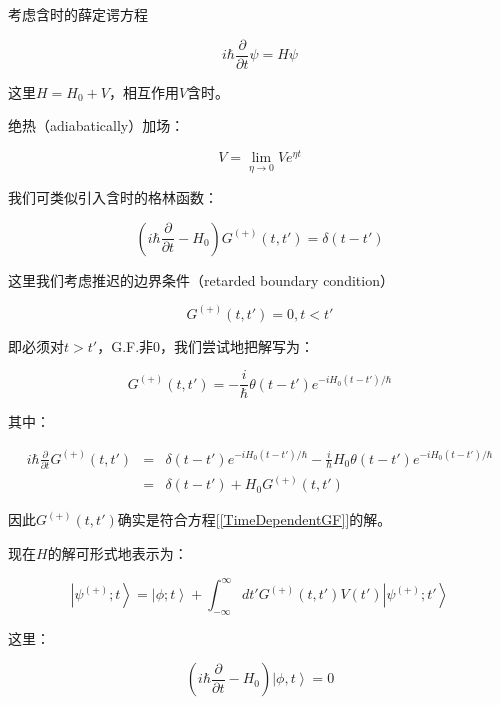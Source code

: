 考虑含时的薛定谔方程

\begin{equation}
i \hbar \frac{\partial }{\partial t} \psi = H \psi
\end{equation}

这里$H = H_0 + V$，相互作用$V$含时。

绝热（adiabatically）加场：

\begin{equation}
V = \lim\limits_{\eta \to 0} V e^{\eta t}
\end{equation}

我们可类似引入含时的格林函数：

\begin{equation}
\left( i \hbar \frac{\partial }{\partial t} - H_0 \right) G^{(+)} (t,t') = \delta(t - t')
\label{TimeDependentGF}
\end{equation}

这里我们考虑推迟的边界条件（retarded boundary condition）

\begin{equation}
G^{(+)} (t , t') = 0 , t<t'
\end{equation}

即必须对$t > t'$，G.F.非0，我们尝试地把解写为：

\begin{equation}
G^{(+)} (t, t') = - \frac{i }{\hbar } \theta(t-t') e^{- i H_0 (t - t') / \hbar}
\end{equation}

其中：

\begin{eqnarray*}
i \hbar \frac{\partial }{\partial t} G^{(+)} (t, t') & = & \delta(t - t')e^{- i H_0 (t - t') / \hbar} - \frac{i }{\hbar} H_0 \theta(t-t')e^{- i H_0 (t - t') / \hbar}  \\
{} & = & \delta(t - t') + H_0 G^{(+)}(t,t') 
\end{eqnarray*}

因此$G^{(+)}(t,t')$确实是符合方程[\ref{TimeDependentGF}]的解。

现在$H$的解可形式地表示为：

\begin{equation}
\left| \psi^{(+)}; t \right\rangle = \left| \phi; t \right\rangle + \int_{- \infty}^{\infty} dt' G^{(+)} (t,t') V(t') \left| \psi^{(+)}; t' \right\rangle 
\end{equation}

这里：

\begin{equation}
\left( i \hbar \frac{\partial }{\partial t} - H_0  \right) \left| \phi , t \right\rangle = 0
\end{equation}

